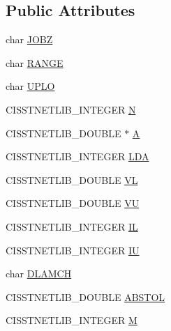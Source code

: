\subsection*{Public Attributes}
\begin{DoxyCompactItemize}
\item 
char \hyperlink{classnmr_symmetric_eigen_problem_1_1_data_a877568a0a03b5a49914b15dafb3154f7}{J\+O\+B\+Z}
\item 
char \hyperlink{classnmr_symmetric_eigen_problem_1_1_data_ab28fe48793808aa0dcfc0c4637a7696f}{R\+A\+N\+G\+E}
\item 
char \hyperlink{classnmr_symmetric_eigen_problem_1_1_data_abde7a48eda7afb8fc30994433a7c995f}{U\+P\+L\+O}
\item 
C\+I\+S\+S\+T\+N\+E\+T\+L\+I\+B\+\_\+\+I\+N\+T\+E\+G\+E\+R \hyperlink{classnmr_symmetric_eigen_problem_1_1_data_a94f546df5490f6bac466922f299fb4fc}{N}
\item 
C\+I\+S\+S\+T\+N\+E\+T\+L\+I\+B\+\_\+\+D\+O\+U\+B\+L\+E $\ast$ \hyperlink{classnmr_symmetric_eigen_problem_1_1_data_aa45f414eef4fb85b15868757aa728448}{A}
\item 
C\+I\+S\+S\+T\+N\+E\+T\+L\+I\+B\+\_\+\+I\+N\+T\+E\+G\+E\+R \hyperlink{classnmr_symmetric_eigen_problem_1_1_data_af258788e3a2b697a671b1bc0f69837bc}{L\+D\+A}
\item 
C\+I\+S\+S\+T\+N\+E\+T\+L\+I\+B\+\_\+\+D\+O\+U\+B\+L\+E \hyperlink{classnmr_symmetric_eigen_problem_1_1_data_a22ea6bd44fed0d8aadac2798d3cdac8e}{V\+L}
\item 
C\+I\+S\+S\+T\+N\+E\+T\+L\+I\+B\+\_\+\+D\+O\+U\+B\+L\+E \hyperlink{classnmr_symmetric_eigen_problem_1_1_data_a72746a653e1db7e9191066101d84cf1e}{V\+U}
\item 
C\+I\+S\+S\+T\+N\+E\+T\+L\+I\+B\+\_\+\+I\+N\+T\+E\+G\+E\+R \hyperlink{classnmr_symmetric_eigen_problem_1_1_data_a67105932298cfc5cf99d0a4fc6839505}{I\+L}
\item 
C\+I\+S\+S\+T\+N\+E\+T\+L\+I\+B\+\_\+\+I\+N\+T\+E\+G\+E\+R \hyperlink{classnmr_symmetric_eigen_problem_1_1_data_a9940018252e49996dd24975e2e6bcddc}{I\+U}
\item 
char \hyperlink{classnmr_symmetric_eigen_problem_1_1_data_a0d4cc9287cdb029e975938ed4c153d65}{D\+L\+A\+M\+C\+H}
\item 
C\+I\+S\+S\+T\+N\+E\+T\+L\+I\+B\+\_\+\+D\+O\+U\+B\+L\+E \hyperlink{classnmr_symmetric_eigen_problem_1_1_data_af5347eda97d1b64505380937953d1d97}{A\+B\+S\+T\+O\+L}
\item 
C\+I\+S\+S\+T\+N\+E\+T\+L\+I\+B\+\_\+\+I\+N\+T\+E\+G\+E\+R \hyperlink{classnmr_symmetric_eigen_problem_1_1_data_a6a36a42cbcee5c64d9f407ad7813f8d6}{M}

\end{DoxyCompactItemize}
